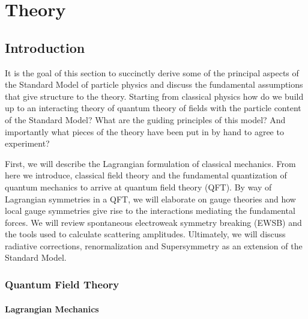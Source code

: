 \chapter{Theory \label{ch:theory}}

\section{Introduction}

It is the goal of this section to succinctly derive some of the 
principal aspects of the Standard Model of particle physics and discuss the fundamental assumptions 
that give structure to the theory. Starting from classical physics how do we build up to an
 interacting theory of quantum theory of fields with the particle content of the Standard Model? 
What are the guiding principles of this model? And importantly what pieces of the theory have been put in by
hand to agree to experiment?

First, we will describe the Lagrangian formulation of classical mechanics. From here we introduce, 
classical field theory and the fundamental quantization of quantum mechanics to arrive at quantum field
theory (QFT). By way of Lagrangian symmetries in a QFT, we will elaborate on
gauge theories and how local gauge symmetries give rise to the interactions mediating the 
fundamental forces. We will review spontaneous electroweak symmetry breaking (EWSB) and the tools
 used to calculate scattering amplitudes. Ultimately, we will discuss radiative corrections, renormalization 
and Supersymmetry as an extension of the Standard Model. 


\subsection{Quantum Field Theory}

\subsubsection{Lagrangian Mechanics}

